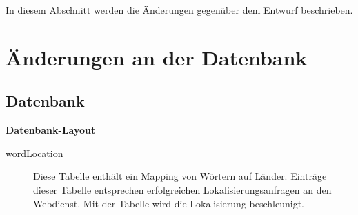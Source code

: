 In diesem Abschnitt werden die Änderungen gegenüber dem Entwurf beschrieben.

\section{Änderungen an der Datenbank}

\subsection{Datenbank}
	\textbf{Datenbank-Layout}
	\begin{description}
		\item[wordLocation] Diese Tabelle enthält ein Mapping von Wörtern auf Länder. Einträge dieser Tabelle entsprechen erfolgreichen Lokalisierungsanfragen an den Webdienst. Mit der Tabelle wird die Lokalisierung  beschleunigt.
	\end{description}

